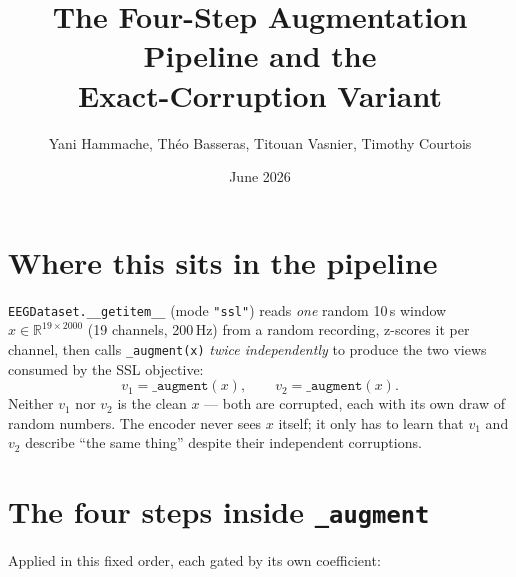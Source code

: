 \documentclass[10pt,a4paper]{article}
\title{\textbf{The Four-Step Augmentation Pipeline and the\\Exact-Corruption Variant}}
\author{Yani Hammache, Théo Basseras, Titouan Vasnier, Timothy Courtois}
\date{June 2026}
\begin{document}
\maketitle

\section{Where this sits in the pipeline}
\texttt{EEGDataset.\_\_getitem\_\_} (mode \texttt{"ssl"}) reads \emph{one} random
10\,s window $x \in \mathbb{R}^{19 \times 2000}$ (19 channels, 200\,Hz) from a random
recording, z-scores it per channel, then calls \texttt{\_augment(x)} \emph{twice
independently} to produce the two views consumed by the SSL objective:
\[
  v_1 = \texttt{\_augment}(x), \qquad v_2 = \texttt{\_augment}(x).
\]
Neither $v_1$ nor $v_2$ is the clean $x$ — both are corrupted, each with its own draw
of random numbers. The encoder never sees $x$ itself; it only has to learn that $v_1$
and $v_2$ describe ``the same thing'' despite their independent corruptions.

\section{The four steps inside \texttt{\_augment}}
Applied in this fixed order, each gated by its own coefficient:
\end{document}
